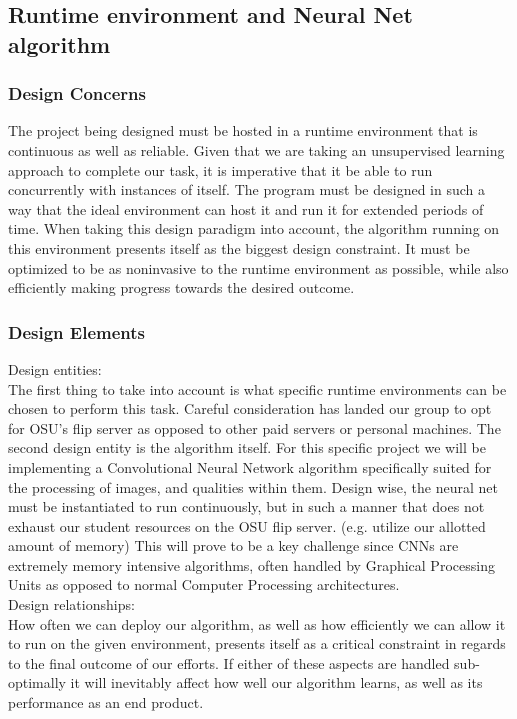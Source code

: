 \documentclass[onecolumn, draftclsnofoot,10pt, compsoc]{IEEEtran}
\begin{document}
\subsection{Runtime environment and Neural Net algorithm}
\subsubsection{Design Concerns}
	The project being designed must be hosted in a runtime environment that is continuous as well as reliable. Given that we are taking an unsupervised learning approach to complete our task, it is imperative that it be able to run concurrently with instances of itself. The program must be designed in such a way that the ideal environment can host it and run it for extended periods of time. When taking this design paradigm into account, the algorithm running on this environment presents itself as the biggest design constraint. It must be optimized to be as noninvasive to the runtime environment as possible, while also efficiently making progress towards the desired outcome. 

\subsubsection{Design Elements}
Design entities:\\
	The first thing to take into account is what specific runtime environments can be chosen to perform this task. Careful consideration has landed our group to opt for OSU’s flip server as opposed to other paid servers or personal machines. The second design entity is the algorithm itself. For this specific project we will be implementing a Convolutional Neural Network algorithm specifically suited for the processing of images, and qualities within them. Design wise, the neural net must be instantiated to run continuously, but in such a manner that does not exhaust our student resources on the OSU flip server. (e.g. utilize our allotted amount of memory) This will prove to be a key challenge since CNNs are extremely memory intensive algorithms, often handled by Graphical Processing Units as opposed to normal Computer Processing architectures. \\

	Design relationships:\\
	How often we can deploy our algorithm, as well as how efficiently we can allow it to run on the given environment, presents itself as a critical constraint in regards to the final outcome of our efforts. If either of these aspects are handled sub-optimally it will inevitably affect how well our algorithm learns, as well as its performance as an end product. \\
\end{document}
